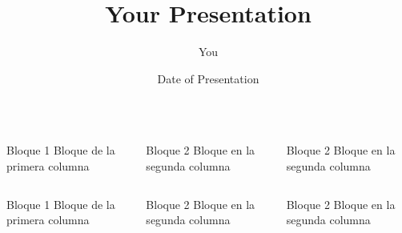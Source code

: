 \documentclass{beamer}
\title[Your Short Title]{Your Presentation}
\author{You}
\institute{Where You're From}
\date{Date of Presentation}
\begin{document}
\begin{frame}
  \begin{columns}[t]
  
  \begin{column}{.30\linewidth}
  \begin{block}{Bloque 1}
  Bloque de la primera columna
  \end{block}
  \end{column}
  
  \begin{column}{.30\linewidth}
  \begin{block}{Bloque 2}
  Bloque en la segunda columna
  \end{block}
  \end{column}
  
  \begin{column}{.30\linewidth}
  \begin{block}{Bloque 2}
  Bloque en la segunda columna
  \end{block}
  \end{column}
  
  \end{columns}
\end{frame}

\begin{frame}
  \begin{columns}[t]
  
  \begin{column}{.30\linewidth}
  \begin{block}{Bloque 1}
  Bloque de la primera columna
  \end{block}
  \end{column}
  
  \begin{column}{.30\linewidth}
  \begin{block}{Bloque 2}
  Bloque en la segunda columna
  \end{block}
  \end{column}
  
  \begin{column}{.30\linewidth}
  \begin{block}{Bloque 2}
  Bloque en la segunda columna
  \end{block}
  \end{column}
  
  \end{columns}
\end{frame}
\end{document}
